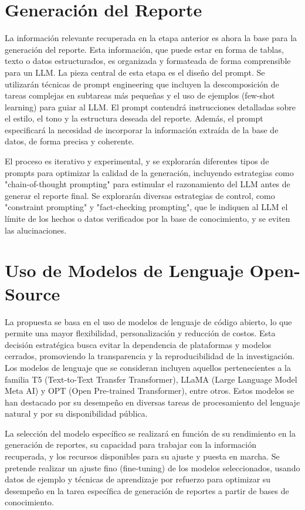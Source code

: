 \section{Generación del Reporte}

La información relevante recuperada en la etapa anterior es ahora la base para la generación del reporte. Esta información, que puede estar en forma de tablas, texto o datos estructurados, es organizada y formateada de forma comprensible para un LLM. La pieza central de esta etapa es el diseño del prompt. Se utilizarán técnicas de prompt engineering que incluyen la descomposición de tareas complejas en subtareas más pequeñas y el uso de ejemplos (few-shot learning) para guiar al LLM. El prompt contendrá instrucciones detalladas sobre el estilo, el tono y la estructura deseada del reporte. Además, el prompt especificará la necesidad de incorporar la información extraída de la base de datos, de forma precisa y coherente.

El proceso es iterativo y experimental, y se explorarán diferentes tipos de prompts para optimizar la calidad de la generación, incluyendo estrategias como "chain-of-thought prompting" para estimular el razonamiento del LLM antes de generar el reporte final. Se explorarán diversas estrategias de control, como "constraint prompting" y "fact-checking prompting", que le indiquen al LLM el límite de los hechos o datos verificados por la base de conocimiento, y se eviten las alucinaciones.

\section{Uso de Modelos de Lenguaje Open-Source}

La propuesta se basa en el uso de modelos de lenguaje de código abierto, lo que permite una mayor flexibilidad, personalización y reducción de costos. Esta decisión estratégica busca evitar la dependencia de plataformas y modelos cerrados, promoviendo la transparencia y la reproducibilidad de la investigación. Los modelos de lenguaje que se consideran incluyen aquellos pertenecientes a la familia T5 (Text-to-Text Transfer Transformer), LLaMA (Large Language Model Meta AI) y OPT (Open Pre-trained Transformer), entre otros. Estos modelos se han destacado por su desempeño en diversas tareas de procesamiento del lenguaje natural y por su disponibilidad pública.

La selección del modelo específico se realizará en función de su rendimiento en la generación de reportes, su capacidad para trabajar con la información recuperada, y los recursos disponibles para su ajuste y puesta en marcha. Se pretende realizar un ajuste fino (fine-tuning) de los modelos seleccionados, usando datos de ejemplo y técnicas de aprendizaje por refuerzo para optimizar su desempeño en la tarea específica de generación de reportes a partir de bases de conocimiento.

